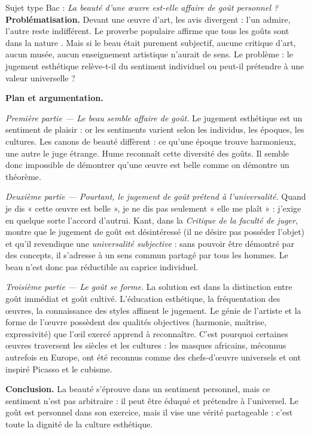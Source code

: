 \documentclass[11pt]{article}
\begin{document}
\begin{exoresolu}
Sujet type Bac : \emph{La beauté d'une œuvre est-elle affaire de goût personnel ?}
\tcblower
\textbf{Problématisation.} Devant une œuvre d'art, les avis divergent : l'un admire, l'autre reste indifférent. Le proverbe populaire affirme que \guillemotleft tous les goûts sont dans la nature \guillemotright. Mais si le beau était purement subjectif, aucune critique d'art, aucun musée, aucun enseignement artistique n'aurait de sens. Le problème : le jugement esthétique relève-t-il du sentiment individuel ou peut-il prétendre à une valeur universelle ?

\textbf{Plan et argumentation.}

\emph{Première partie — Le beau semble affaire de goût.} Le jugement esthétique est un sentiment de plaisir : or les sentiments varient selon les individus, les époques, les cultures. Les canons de beauté diffèrent : ce qu'une époque trouve harmonieux, une autre le juge étrange. Hume reconnaît cette diversité des goûts. Il semble donc impossible de démontrer qu'une œuvre est belle comme on démontre un théorème.

\emph{Deuxième partie — Pourtant, le jugement de goût prétend à l'universalité.} Quand je dis « cette œuvre est belle », je ne dis pas seulement « elle me plaît » : j'exige en quelque sorte l'accord d'autrui. Kant, dans la \emph{Critique de la faculté de juger}, montre que le jugement de goût est désintéressé (il ne désire pas posséder l'objet) et qu'il revendique une \emph{universalité subjective} : sans pouvoir être démontré par des concepts, il s'adresse à un \guillemotleft sens commun \guillemotright partagé par tous les hommes. Le beau n'est donc pas réductible au caprice individuel.

\emph{Troisième partie — Le goût se forme.} La solution est dans la distinction entre goût immédiat et goût cultivé. L'éducation esthétique, la fréquentation des œuvres, la connaissance des styles affinent le jugement. Le génie de l'artiste et la forme de l'œuvre possèdent des qualités objectives (harmonie, maîtrise, expressivité) que l'œil exercé apprend à reconnaître. C'est pourquoi certaines œuvres traversent les siècles et les cultures : les masques africains, méconnus autrefois en Europe, ont été reconnus comme des chefs-d'œuvre universels et ont inspiré Picasso et le cubisme.

\textbf{Conclusion.} La beauté s'éprouve dans un sentiment personnel, mais ce sentiment n'est pas arbitraire : il peut être éduqué et prétendre à l'universel. Le goût est personnel dans son exercice, mais il vise une vérité partageable : c'est toute la dignité de la culture esthétique.
\end{exoresolu}
\end{document}
